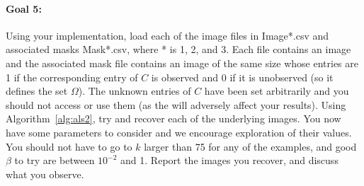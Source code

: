 \documentclass[11pt,onecolumn]{article}
\newcommand{\bluebox}[1]{
  \begin{tcolorbox}[colback=blue!5!white,colframe=blue!75!black,boxrule=0.5pt,boxsep=0pt,left=6pt,right=16pt,top=4pt,bottom=4pt]
  #1
  \end{tcolorbox}   
}
\begin{document}
\bluebox{
\paragraph{Goal 5:}
Using your implementation, load each of the image files in Image*.csv and associated masks Mask*.csv, where * is 1, 2, and 3. Each file contains an image and the associated mask file contains an image of the same size whose entries are 1 if the corresponding entry of $C$ is observed and 0 if it is unobserved (so it defines the set $\Omega$). The unknown entries of $C$ have been set arbitrarily and you should not access or use them (as the will adversely affect your results). Using Algorithm~\ref{alg:als2}, try and recover each of the underlying images. You now have some parameters to consider and we encourage exploration of their values. You should not have to go to $k$ larger than 75 for any of the examples, and good $\beta$ to try are between $10^{-2}$ and 1. Report the images you recover, and discuss what you observe.}




\end{document}
